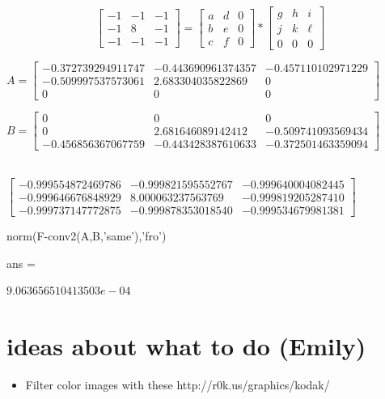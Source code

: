 \documentclass[12pt]{amsart}
\theoremstyle{definition}
\theoremstyle{remark}
\numberwithin{thm}{section}
\begin{document}
$$
\begin{bmatrix}
-1 & -1 & -1\\
-1 & 8 & -1\\
-1 & -1 & -1
\end{bmatrix}
=
\begin{bmatrix}
a & d & 0\\
b & e & 0\\
c & f & 0
\end{bmatrix} *
\begin{bmatrix}
g & h & i\\
j & k & \ell \\
0 & 0 & 0
\end{bmatrix}
$$

$
A =
\begin{bmatrix}
  -0.372739294911747  &-0.443690961374357 & -0.457110102971229\\
  -0.509997537573061  & 2.683304035822869 &                  0\\
                   0  &                 0 &                  0
\end{bmatrix}
$

$
B =
\begin{bmatrix}
                   0&                   0&                   0\\
                   0&   2.681646089142412&  -0.509741093569434\\
  -0.456856367067759&  -0.443428387610633&  -0.372501463359094
\end{bmatrix}
$

\\
$
\begin{bmatrix}
  -0.999554872469786  &-0.999821595552767  &-0.999640004082445\\
  -0.999646676848929  & 8.000063237563769  &-0.999819205287410\\
  -0.999737147772875  &-0.999878353018540  &-0.999534679981381
  \end{bmatrix}
$
  
  norm(F-conv2(A,B,'same'),'fro')

ans =

     $9.063656510413503e-04$

\section{ideas about what to do (Emily)}
\begin{itemize}

\item Filter color images with these 
http://r0k.us/graphics/kodak/

\end{itemize}
\end{document}
